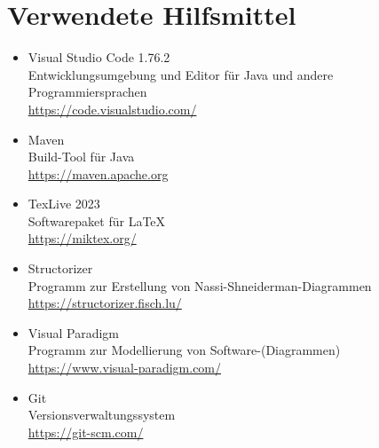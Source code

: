 \chapter{Verwendete Hilfsmittel}\label{ch:verwendete-hilfsmittel}

\begin{itemize}
    \item Visual Studio Code 1.76.2\\ Entwicklungsumgebung und Editor für Java und andere Programmiersprachen \\\url{https://code.visualstudio.com/}
    \item Maven\\Build-Tool für Java\\\url{https://maven.apache.org}
    \item TexLive 2023\\Softwarepaket für \LaTeX\\\url{https://miktex.org/}
    \item Structorizer\\Programm zur Erstellung von Nassi-Shneiderman-Diagrammen \\\url{https://structorizer.fisch.lu/}
    \item Visual Paradigm\\Programm zur Modellierung von Software-(Diagrammen) \\\url{https://www.visual-paradigm.com/}
    \item Git\\Versionsverwaltungssystem \\\url{https://git-scm.com/}
\end{itemize}
